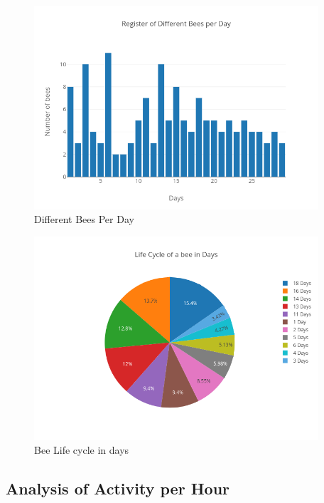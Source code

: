 \documentclass[11pt,fleqn]{book} %
\begin{document}
\begin{figure}[h!]%
\centering%
\includegraphics[width=400px]{Pictures/plots/good/Morelia Hive 1differentBeesPerdayClean.png}%
\caption{Different Bees Per Day}%
\end{figure}

%


\begin{figure}[h!]%
\centering%
\includegraphics[width=400px]{Pictures/plots/good/Morelia Hive 1pieBeeLifeCycleClean.png}%
\caption{Bee Life cycle in days}%
\end{figure}

%
\subsection{Analysis of Activity per Hour}%
\label{subsec:Analysis of Activity per Hour}%
\end{document}
